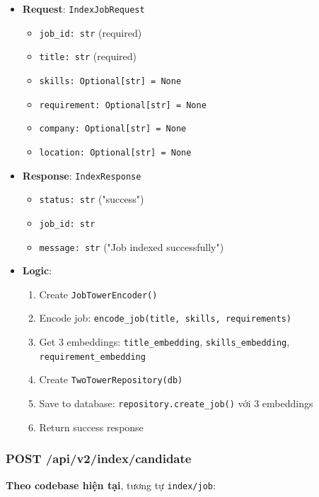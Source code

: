 \begin{itemize}
    \item \textbf{Request}: \texttt{IndexJobRequest}
    \begin{itemize}
        \item \texttt{job\_id: str} (required)
        \item \texttt{title: str} (required)
        \item \texttt{skills: Optional[str] = None}
        \item \texttt{requirement: Optional[str] = None}
        \item \texttt{company: Optional[str] = None}
        \item \texttt{location: Optional[str] = None}
    \end{itemize}
    
    \item \textbf{Response}: \texttt{IndexResponse}
    \begin{itemize}
        \item \texttt{status: str} ("success")
        \item \texttt{job\_id: str}
        \item \texttt{message: str} ("Job indexed successfully")
    \end{itemize}
    
    \item \textbf{Logic}:
    \begin{enumerate}
        \item Create \texttt{JobTowerEncoder()}
        \item Encode job: \texttt{encode\_job(title, skills, requirements)}
        \item Get 3 embeddings: \texttt{title\_embedding}, \texttt{skills\_embedding}, \texttt{requirement\_embedding}
        \item Create \texttt{TwoTowerRepository(db)}
        \item Save to database: \texttt{repository.create\_job()} với 3 embeddings
        \item Return success response
    \end{enumerate}
\end{itemize}

\subsubsection{POST /api/v2/index/candidate}

\textbf{Theo codebase hiện tại}, tương tự \texttt{index/job}:

